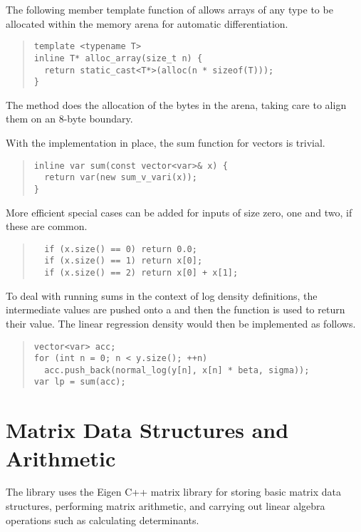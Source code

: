 \documentclass[10pt]{article}
\begin{document}
The following member template function of  allows
arrays of any type to be allocated within the memory arena for
automatic differentiation.
%
\begin{quote}
\begin{Verbatim}
template <typename T>
inline T* alloc_array(size_t n) {
  return static_cast<T*>(alloc(n * sizeof(T)));
}
\end{Verbatim}
\end{quote}
%
The  method does the allocation of the bytes in the
arena, taking care to align them on an 8-byte boundary.  

With the implementation in place, the sum function for vectors is
trivial.
%
\begin{quote}
\begin{Verbatim}
inline var sum(const vector<var>& x) {
  return var(new sum_v_vari(x));
}
\end{Verbatim}
\end{quote}
%
More efficient special cases can be added for inputs of size zero, one
and two, if these are common.
%
\begin{quote}
\begin{Verbatim}
  if (x.size() == 0) return 0.0;
  if (x.size() == 1) return x[0];
  if (x.size() == 2) return x[0] + x[1];
\end{Verbatim}
\end{quote}

To deal with running sums in the context of log density definitions, 
the intermediate values are pushed onto a  and then
the  function is used to return their value.  The linear
regression density would then be implemented as follows.
%
\begin{quote}
\begin{Verbatim}
vector<var> acc;
for (int n = 0; n < y.size(); ++n)
  acc.push_back(normal_log(y[n], x[n] * beta, sigma));
var lp = sum(acc);
\end{Verbatim}
\end{quote}




\section{Matrix Data Structures and Arithmetic}

The  library uses the Eigen C++ matrix library for
storing basic matrix data structures, performing matrix arithmetic,
and carrying out linear algebra operations such as calculating
determinants.
\end{document}
